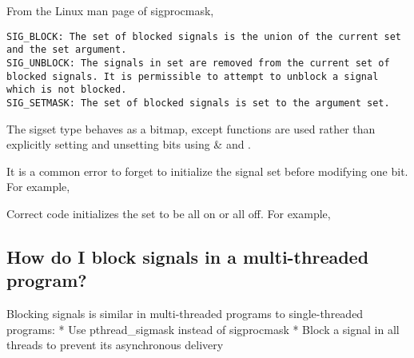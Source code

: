 From the Linux man page of sigprocmask,

\begin{verbatim}
SIG_BLOCK: The set of blocked signals is the union of the current set and the set argument.
SIG_UNBLOCK: The signals in set are removed from the current set of blocked signals. It is permissible to attempt to unblock a signal which is not blocked.
SIG_SETMASK: The set of blocked signals is set to the argument set.
\end{verbatim}

The sigset type behaves as a bitmap, except functions are used rather
than explicitly setting and unsetting bits using \& and \textbar{}.

It is a common error to forget to initialize the signal set before
modifying one bit. For example,

\begin{Shaded}
\begin{Highlighting}[]
\end{Highlighting}
\end{Shaded}

Correct code initializes the set to be all on or all off. For example,

\begin{Shaded}
\begin{Highlighting}[]

\end{Highlighting}
\end{Shaded}

\subsection{How do I block signals in a multi-threaded
program?}\label{how-do-i-block-signals-in-a-multi-threaded-program}

Blocking signals is similar in multi-threaded programs to
single-threaded programs: * Use pthread\_sigmask instead of sigprocmask
* Block a signal in all threads to prevent its asynchronous delivery

